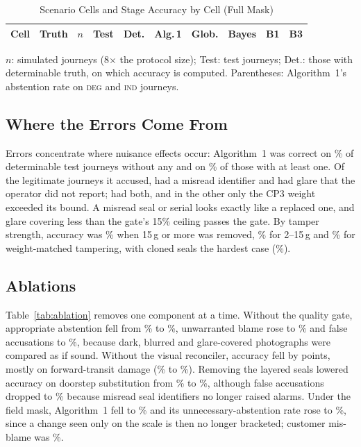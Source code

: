 \documentclass[conference]{IEEEtran}
\newcommand{\DEG}{\textsc{deg}}
\newcommand{\IND}{\textsc{ind}}
\begin{document}
\begin{table}[t]
\caption{Scenario Cells and Stage Accuracy by Cell (Full Mask)}
\label{tab:cells}
\centering
\footnotesize
\setlength{\tabcolsep}{1.0pt}
\begin{tabular}{@{}lccccccccc@{}}
\toprule
Cell & Truth & $n$ & Test & Det. & Alg.\,1 & Glob. & Bayes & B1 & B3 \\
\midrule

\end{tabular}

\vspace{2pt}
\parbox{0.96\columnwidth}{\footnotesize $n$: simulated journeys (8$\times$ the protocol size); Test: test journeys; Det.: those with determinable truth, on which accuracy is computed. Parentheses: Algorithm~1's abstention rate on \DEG{} and \IND{} journeys.}
\end{table}

\subsection{Where the Errors Come From}
\label{sec:errors}
Errors concentrate where nuisance effects occur: Algorithm~1 was correct on \NoNuisAcc\% of determinable test journeys without any and on \NuisAcc\% of those with at least one. Of the \FATotal{} legitimate journeys it accused, \FAMisread{} had a misread identifier and \FAGlare{} had glare that the operator did not report; \FABoth{} had both, and in the other \FANeither{} only the CP3 weight exceeded its bound. A misread seal or serial looks exactly like a replaced one, and glare covering less than the gate's 15\% ceiling passes the gate. By tamper strength, accuracy was \MassBig\% when 15\,g or more was removed, \MassSmall\% for 2--15\,g and \MassZero\% for weight-matched tampering, with cloned seals the hardest case (\Cloned\%).

\subsection{Ablations}
Table~\ref{tab:ablation} removes one component at a time. Without the quality gate, appropriate abstention fell from \AbFullAAR\% to \AbNoQAAR\%, unwarranted blame rose to \AbNoQUBR\% and false accusations to \AbNoQFA\%, because dark, blurred and glare-covered photographs were compared as if sound. Without the visual reconciler, accuracy fell by \AbNoVisDrop{} points, mostly on forward-transit damage (\AbFwdFull\% to \AbFwdNoVis\%). Removing the layered seals lowered accuracy on doorstep substitution from \AbDoorFull\% to \AbDoorNoSeal\%, although false accusations dropped to \AbNoSealFA\% because misread seal identifiers no longer raised alarms. Under the field mask, Algorithm~1 fell to \FAlgAcc\% and its unnecessary-abstention rate rose to \FAlgUAR\%, since a change seen only on the scale is then no longer bracketed; customer mis-blame was \FAlgMis\%.
\end{document}

